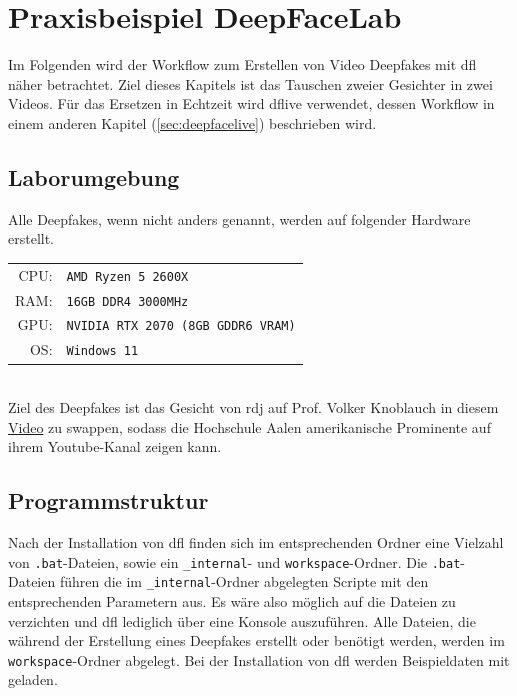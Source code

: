 \section{Praxisbeispiel DeepFaceLab}\label{sec:praxisbeispiel-dfl}
Im Folgenden wird der Workflow zum Erstellen von Video Deepfakes mit \gls{dfl} näher betrachtet.
Ziel dieses Kapitels ist das Tauschen zweier Gesichter in zwei Videos.
Für das Ersetzen in Echtzeit wird \gls{dflive} verwendet, dessen Workflow in einem anderen Kapitel (\ref{sec:deepfacelive}) beschrieben wird.

\subsection{Laborumgebung}\label{subsec:laborumgebung}
Alle Deepfakes, wenn nicht anders genannt, werden auf folgender Hardware erstellt.\\[0.5cm]
\begin{tabular}{rl}
    CPU:& \texttt{AMD Ryzen 5 2600X}\\
    RAM:& \texttt{16GB DDR4 3000MHz}\\
    GPU:& \texttt{NVIDIA RTX 2070 (8GB GDDR6 VRAM)}\\
    OS:& \texttt{Windows 11}
\end{tabular}\\[0.5cm]

Ziel des Deepfakes ist das Gesicht von \gls{rdj} auf Prof. Volker Knoblauch in diesem \href{https://www.youtube.com/watch?v=rksMPlRSbQU}{Video} zu swappen,
sodass die Hochschule Aalen amerikanische Prominente auf ihrem Youtube-Kanal zeigen kann.

\subsection{Programmstruktur}\label{subsec:programmstruktur}
Nach der Installation von \gls{dfl} finden sich im entsprechenden Ordner eine Vielzahl von \texttt{.bat}-Dateien, sowie ein \texttt{\_internal}- und \texttt{workspace}-Ordner.
Die \texttt{.bat}-Dateien führen die im \texttt{\_internal}-Ordner abgelegten Scripte mit den entsprechenden Parametern aus.
Es wäre also möglich auf die Dateien zu verzichten und \gls{dfl} lediglich über eine Konsole auszuführen.
Alle Dateien, die während der Erstellung eines Deepfakes erstellt oder benötigt werden, werden im \texttt{workspace}-Ordner abgelegt.
Bei der Installation von \gls{dfl} werden Beispieldaten mit geladen.\\

